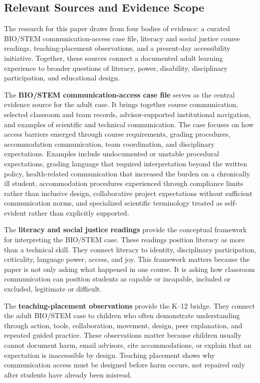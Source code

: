 \subsection*{Relevant Sources and Evidence Scope}

The research for this paper draws from four bodies of evidence: a curated BIO/STEM communication-access case file, literacy and social justice course readings, teaching-placement observations, and a present-day accessibility initiative. Together, these sources connect a documented adult learning experience to broader questions of literacy, power, disability, disciplinary participation, and educational design.

The \textbf{BIO/STEM communication-access case file} serves as the central evidence source for the adult case. It brings together course communication, selected classroom and team records, advisor-supported institutional navigation, and examples of scientific and technical communication. The case focuses on how access barriers emerged through course requirements, grading procedures, accommodation communication, team coordination, and disciplinary expectations. Examples include undocumented or unstable procedural expectations, grading language that required interpretation beyond the written policy, health-related communication that increased the burden on a chronically ill student, accommodation procedures experienced through compliance limits rather than inclusive design, collaborative project expectations without sufficient communication norms, and specialized scientific terminology treated as self-evident rather than explicitly supported.

The \textbf{literacy and social justice readings} provide the conceptual framework for interpreting the BIO/STEM case. These readings position literacy as more than a technical skill. They connect literacy to identity, disciplinary participation, criticality, language power, access, and joy. This framework matters because the paper is not only asking what happened in one course. It is asking how classroom communication can position students as capable or incapable, included or excluded, legitimate or difficult.

The \textbf{teaching-placement observations} provide the K--12 bridge. They connect the adult BIO/STEM case to children who often demonstrate understanding through action, tools, collaboration, movement, design, peer explanation, and repeated guided practice. These observations matter because children usually cannot document harm, email advisors, cite accommodations, or explain that an expectation is inaccessible by design. Teaching placement shows why communication access must be designed before harm occurs, not repaired only after students have already been misread.

